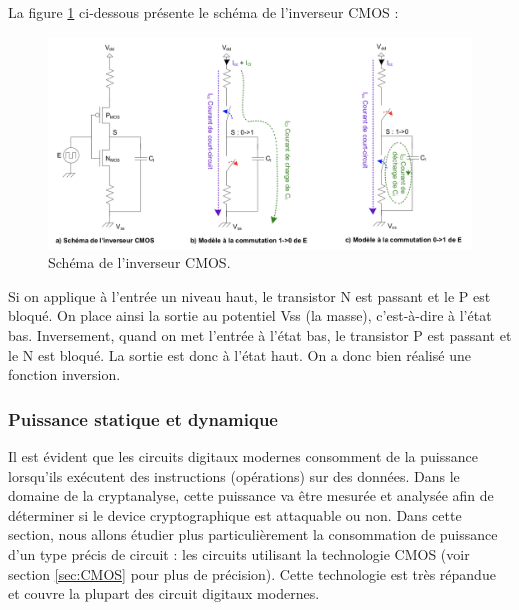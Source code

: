 \documentclass[10pt, oneside, a4paper]{article}
\begin{document}
\hspace{-0.5 cm}La figure \ref{fig:CMOS} ci-dessous présente le schéma de l'inverseur CMOS :
\begin{figure}[htbp]
    \centering
    \includegraphics[scale=0.8]{image/CMOS}
    \caption{Schéma de l'inverseur CMOS.}
    \label{fig:CMOS} 
\end{figure}

Si on applique à l'entrée un niveau haut, le transistor N est passant et le P est bloqué. On place ainsi la sortie au potentiel Vss (la masse), c'est-à-dire à l'état bas. Inversement, quand on met l'entrée à l'état bas, le transistor P est passant et le N est bloqué. La sortie est donc à l'état haut. On a donc bien réalisé une fonction inversion.


\subsubsection{Puissance statique et dynamique}
\label{sec:puissance}
Il est évident que les circuits digitaux modernes consomment de la puissance lorsqu'ils exécutent des instructions (opérations) sur des données. Dans le domaine de la cryptanalyse, cette puissance va être mesurée et analysée afin de déterminer si le device cryptographique est attaquable ou non. Dans cette section, nous allons étudier plus particulièrement la consommation de puissance d'un type précis de circuit : les circuits utilisant la technologie CMOS (voir section \ref{sec:CMOS} pour plus de précision). Cette technologie est très répandue et couvre la plupart des circuit digitaux modernes. 
\end{document}
